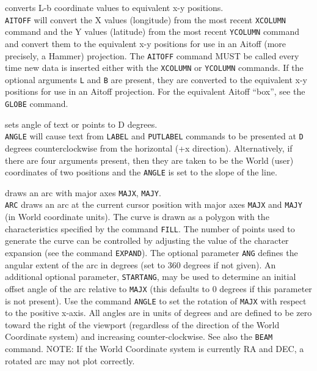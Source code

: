 \item [{\tt AITOFF [L B] } --] converts L-b coordinate values to equivalent x-y positions.\\
	{\tt AITOFF} will convert the X values (longitude) from
	the most recent {\tt XCOLUMN}
	command and the Y values (latitude) from the most recent
	{\tt YCOLUMN} command and convert them
	to the equivalent x-y positions for use in an Aitoff (more
	precisely, a Hammer) projection.  The {\tt AITOFF}
	command MUST be called every time new data is inserted either
	with the {\tt XCOLUMN} or
	{\tt YCOLUMN} commands.  If the
	optional arguments {\tt L} and {\tt B} are present,
	they are converted to the equivalent x-y positions for use in
	an Aitoff projection.  For the equivalent Aitoff ``box'', see the
	{\tt GLOBE} command.
\item [{\tt ANGLE D or ANGLE X1 X2 Y1 Y2 } --] sets angle of text or points to D degrees.\\
	{\tt ANGLE} will cause text from
	{\tt LABEL} and
	{\tt PUTLABEL} commands to be
	presented at {\tt D} degrees counterclockwise from the
	horizontal (+x direction).  Alternatively, if there are four
	arguments present, then they are taken to be the World (user)
	coordinates of two positions and the {\tt ANGLE} is set
	to the slope of the line.
\item [{\tt ARC MAJX MAJY [ANG [STARTANG]] } --] draws an arc with major axes {\tt MAJX}, {\tt MAJY}.\\
	{\tt ARC} draws an arc at the current cursor position
	with major axes {\tt MAJX} and {\tt MAJY} (in World
	coordinate units).  The curve is drawn as a polygon with the
	characteristics specified by the command
	{\tt FILL}.  The number of points used to
	generate the curve can be controlled by adjusting the value of
	the character expansion
	(see the command {\tt EXPAND}).
	The optional parameter {\tt ANG} defines the angular extent
	of the arc in degrees (set to 360 degrees if not given).
	An additional optional parameter, {\tt STARTANG},
	may be used to determine an initial offset angle of the arc relative to
	{\tt MAJX} (this defaults to 0 degrees if this parameter is
	not present).  Use the command {\tt ANGLE}
	to set the rotation of {\tt MAJX} with respect to the
	positive x-axis.  All angles are in units of degrees and are
	defined to be zero toward the right of the viewport
	(regardless of the direction of the World Coordinate system)
	and increasing counter-clockwise.
	See also the {\tt BEAM} command.
	NOTE: If the World Coordinate system
	is currently RA and DEC, a rotated arc may not plot correctly.
